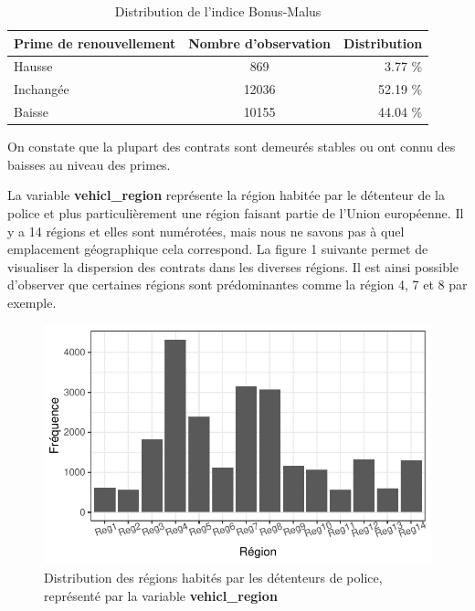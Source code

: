 \documentclass[
]{article}
\begin{document}
\begin{table}[ht]
\centering
\caption{Distribution de l'indice Bonus-Malus} 
\label{tbl:policyBM}
\begin{tabular}{lcr}
  \hline
Prime de renouvellement & Nombre d'observation & Distribution \\ 
  \hline
Hausse & 869 & 3.77 \% \\ 
  Inchangée & 12036 & 52.19 \% \\ 
  Baisse & 10155 & 44.04 \% \\ 
   \hline
\end{tabular}
\end{table}

On constate que la plupart des contrats sont demeurés stables ou ont
connu des baisses au niveau des primes.

La variable \textbf{vehicl\_region} représente la région habitée par le
détenteur de la police et plus particulièrement une région faisant
partie de l'Union européenne. Il y a 14 régions et elles sont
numérotées, mais nous ne savons pas à quel emplacement géographique cela
correspond. La figure 1 suivante permet de visualiser la dispersion des
contrats dans les diverses régions. Il est ainsi possible d'observer que
certaines régions sont prédominantes comme la région 4, 7 et 8 par
exemple.

\begin{figure}

{\centering \includegraphics{01-Rapport_files/figure-latex/graph_vehicl_region-1} 

}

\caption{\label{fig:vehiclregion}Distribution des régions habités par les détenteurs de police, représenté par la variable \textbf{vehicl\_region}}\label{fig:graph_vehicl_region}
\end{figure}
\end{document}
